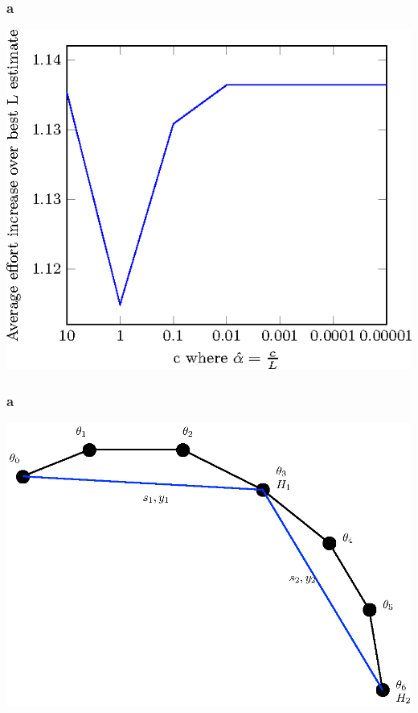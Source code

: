 \documentclass{beamer}
\begin{document}
							 \begin{frame}
							 	\frametitle{a}
							 				\includegraphics[scale=1]{figures/Fig9.eps}
							 \end{frame} 

							 \begin{frame}
							 	\frametitle{a}
							 				\includegraphics[scale=1]{figures/1.eps}
							 \end{frame} 
							 
							 
							 
							 
							 
							 
							 
							 
							 
							 
\end{document}
